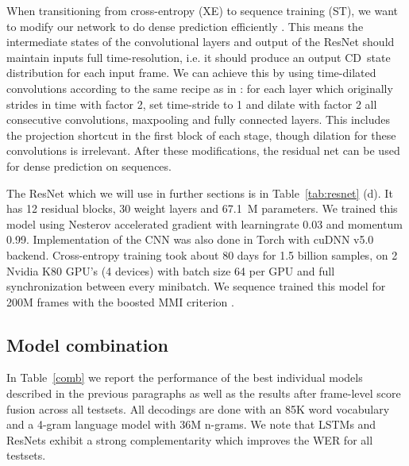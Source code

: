 \documentclass[a4paper]{article}
\begin{document}
When transitioning from cross-entropy (XE) to sequence training (ST), we want to modify our network to do dense prediction efficiently \cite{sercu2016dense}.
This means the intermediate states of the convolutional layers and output of the ResNet should maintain inputs full time-resolution, i.e. it should produce an output CD~state distribution for each input frame.
We can achieve this by using time-dilated convolutions according to the same recipe as in \cite{sercu2016dense}:
for each layer which originally strides in time with factor 2, set time-stride to 1 and dilate with factor 2 all consecutive convolutions, maxpooling and fully connected layers.
This includes the projection shortcut in the first block of each stage, though dilation for these  convolutions is irrelevant.
After these modifications, the residual net can be used for dense prediction on sequences.

The ResNet which we will use in further sections is in Table~\ref{tab:resnet} (d).
It has 12 residual blocks, 30 weight layers and 67.1~M parameters.
We trained this model using Nesterov accelerated gradient with learningrate 0.03 and momentum 0.99.
Implementation of the CNN was also done in Torch with cuDNN v5.0 backend.
Cross-entropy training took about 80 days for 1.5 billion samples, on 2 Nvidia K80 GPU's (4 devices) with batch size 64 per GPU and full synchronization between every minibatch.
We sequence trained this model for 200M frames with the boosted MMI criterion \cite{povey08}.

\subsection{Model combination}
In Table~\ref{comb} we report the performance of the best individual
models described in the previous paragraphs as well as the results
after frame-level score fusion across all testsets. All decodings are
done with an 85K word vocabulary and a 4-gram language model with 36M
n-grams. We note that LSTMs and ResNets exhibit a strong
complementarity which improves the WER for all testsets.
\end{document}
